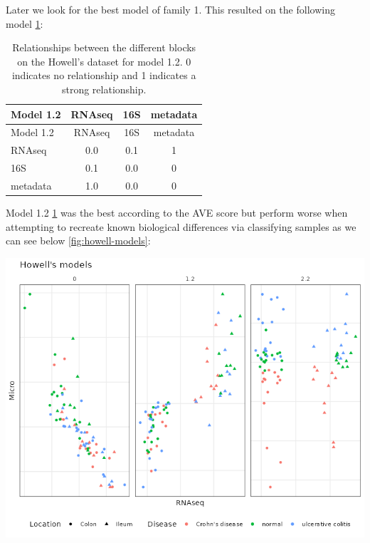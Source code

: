 \documentclass[
  a4paper,
]{book}
\let\origfigure\figure
\let\endorigfigure\endfigure
\renewenvironment{figure}[1][2] {
    \expandafter\origfigure\expandafter[!ht]
} {
    \endorigfigure
}
\begin{document}
Later we look for the best model of family 1.
This resulted on the following model \ref{tab:howell-model1-2}:

\begin{longtable}[]{@{}lccc@{}}
\caption{\label{tab:howell-model1-2} Relationships between the different blocks on the Howell's dataset for model 1.2. 0 indicates no relationship and 1 indicates a strong relationship.}\tabularnewline
\toprule
Model 1.2 & RNAseq & 16S & metadata \\
\midrule
\endfirsthead
\toprule
Model 1.2 & RNAseq & 16S & metadata \\
\midrule
\endhead
RNAseq & 0.0 & 0.1 & 1 \\
16S & 0.1 & 0.0 & 0 \\
metadata & 1.0 & 0.0 & 0 \\
\bottomrule
\end{longtable}

Model 1.2 \ref{tab:howell-model1-2} was the best according to the AVE score but perform worse when attempting to recreate known biological differences via classifying samples as we can see below \ref{fig:howell-models}:

\begin{figure}
\centering
\includegraphics{images/howell-models.png}
\caption{\label{fig:howell-models} The three main models, model 0, 1.2 and 2.2 on the Howell's dataset colored by section colon, ileum and shape according to the disease: square, ulcerative colitis; triangle, normal; circle, Crohn's disease. Model 0 has just trancriptomic and microbiome data, model 1.2 has transcriptomic, microbiome and sample data and model 2.2 has transcriptomic, microbiome and sample data split in different blocks.}
\end{figure}
\end{document}

